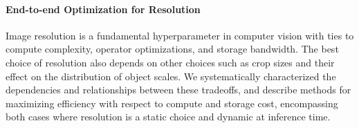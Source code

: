 \paragraph{End-to-end Optimization for Resolution}
Image resolution is a fundamental hyperparameter in computer vision with ties to compute complexity, operator optimizations, and storage bandwidth.
The best choice of resolution also depends on other choices such as crop sizes and their effect on the distribution of object scales.
We systematically characterized the dependencies and relationships between these tradeoffs, and describe methods for maximizing efficiency with respect to compute and storage cost, encompassing both cases where resolution is a static choice and dynamic at inference time.

